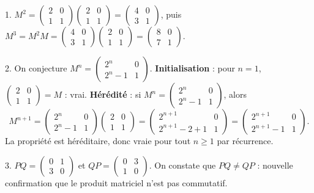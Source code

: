 \documentclass[11pt]{article}
\begin{document}
\begin{corrige}
1. $M^2 = \begin{pmatrix} 2 & 0 \\ 1 & 1 \end{pmatrix}\begin{pmatrix} 2 & 0 \\ 1 & 1 \end{pmatrix} = \begin{pmatrix} 4 & 0 \\ 3 & 1 \end{pmatrix}$, puis $M^3 = M^2 M = \begin{pmatrix} 4 & 0 \\ 3 & 1 \end{pmatrix}\begin{pmatrix} 2 & 0 \\ 1 & 1 \end{pmatrix} = \begin{pmatrix} 8 & 0 \\ 7 & 1 \end{pmatrix}$.

2. On conjecture $M^n = \begin{pmatrix} 2^n & 0 \\ 2^n - 1 & 1 \end{pmatrix}$. \textbf{Initialisation} : pour $n=1$, $\begin{pmatrix} 2 & 0 \\ 1 & 1 \end{pmatrix} = M$ : vrai. \textbf{Hérédité} : si $M^n = \begin{pmatrix} 2^n & 0 \\ 2^n - 1 & 1 \end{pmatrix}$, alors
\[ M^{n+1} = \begin{pmatrix} 2^n & 0 \\ 2^n - 1 & 1 \end{pmatrix}\begin{pmatrix} 2 & 0 \\ 1 & 1 \end{pmatrix} = \begin{pmatrix} 2^{n+1} & 0 \\ 2^{n+1} - 2 + 1 & 1 \end{pmatrix} = \begin{pmatrix} 2^{n+1} & 0 \\ 2^{n+1} - 1 & 1 \end{pmatrix}. \]
La propriété est héréditaire, donc vraie pour tout $n \geq 1$ par récurrence.

3. $PQ = \begin{pmatrix} 0 & 1 \\ 3 & 0 \end{pmatrix}$ et $QP = \begin{pmatrix} 0 & 3 \\ 1 & 0 \end{pmatrix}$. On constate que $PQ \neq QP$ : nouvelle confirmation que le produit matriciel n'est pas commutatif.
\end{corrige}
\end{document}
